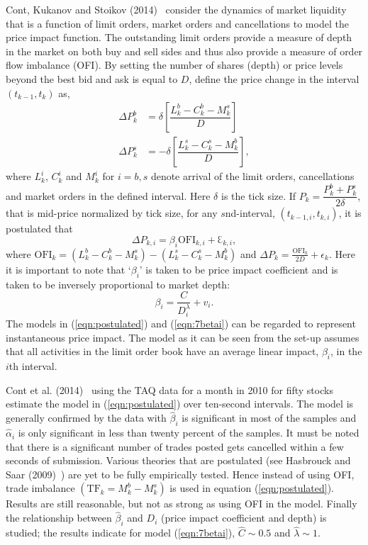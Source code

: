 Cont, Kukanov and Stoikov (2014)~\cite{contkulst} consider the dynamics of market liquidity that is a function of limit orders, market orders and cancellations to model the price impact function. The outstanding limit orders provide a measure of depth in the market on both buy and sell sides and thus also provide a measure of order flow imbalance (OFI). By setting the number of shares (depth) or price levels beyond the best bid and ask is equal to $D$, define the price change in the interval $(t_{k-1},t_k)$ as,
	\begin{equation}\label{eqn:doubleeq}
	\begin{split}
	\Delta P_k^b&= \delta \left[ \dfrac{L_k^b - C_k^b - M_k^s}{D} \right] \\
	\Delta P_k^s&= -\delta \left[\dfrac{L_k^s-C_k^s-M_k^b}{D}\right],
	\end{split}
	\end{equation}
where $L_k^i$, $C_k^i$ and $M_k^i$ for $i=b,s$ denote arrival of the limit orders, cancellations and market orders in the defined interval. Here $\delta$ is the tick size. If $P_k=\dfrac{P_k^b+P_k^s}{2\delta}$, that is mid-price normalized by tick size, for any $s$nd-interval, $(t_{k-1,i},t_{k,i})$, it is postulated that
	\begin{equation}\label{eqn:postulated}
	\Delta P_{k,i} = \beta_i \text{OFI}_{k,i} + \Eulerconst_{k,i},
	\end{equation}
where $\text{OFI}_k=(L_k^b-C_k^b-M_k^s)-(L_k^s-C_k^s-M_k^b)$ and $\Delta P_k=\frac{\text{OFI}_k}{2D}+\epsilon_k$. Here it is important to note that `$\beta_i$' is taken to be price impact coefficient and is taken to be inversely proportional to market depth:
	\begin{equation}\label{eqn:7betai}
	\beta_i=\dfrac{C}{D_i^\lambda} + v_i.
	\end{equation}
The models in (\ref{eqn:postulated}) and (\ref{eqn:7betai}) can be regarded to represent instantaneous price impact. The model as it can be seen from the set-up assumes that all activities in the limit order book have an average linear impact, $\beta_i$, in the $i$th interval. 


Cont et al. (2014)~\cite{contkulst} using the TAQ data for a month in 2010 for fifty stocks estimate the model in (\ref{eqn:postulated}) over ten-second intervals. The model is generally confirmed by the data with $\hat{\beta}_i$ is significant in most of the samples and $\hat{\alpha}_i$ is only significant in less than twenty percent of the samples. It must be noted that there is a significant number of trades posted gets cancelled within a few seconds of submission. Various theories that are postulated (see Hasbrouck and Saar (2009)~\cite{habbrooksaar}) are yet to be fully empirically tested. Hence instead of using OFI, trade imbalance $(\text{TF}_k=M_k^b-M_k^s)$ is used in equation (\ref{eqn:postulated}). Results are still reasonable, but not as strong as using OFI in the model. Finally the relationship between $\hat{\beta}_i$ and $D_i$ (price impact coefficient and depth) is studied; the results indicate for model (\ref{eqn:7betai}), $\hat{C} \sim 0.5$ and $\hat{\lambda} \sim 1$. 


